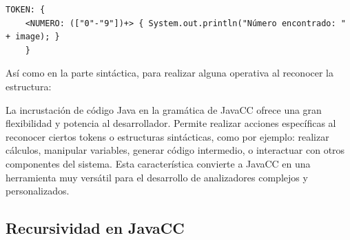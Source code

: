\begin{lstlisting}
TOKEN: {
	<NUMERO: (["0"-"9"])+> { System.out.println("Número encontrado: " + image); }
	}
\end{lstlisting}

Así como en la parte sintáctica, para realizar alguna operativa al reconocer la estructura:

\lstset{inputencoding=utf8/latin1}



La incrustación de código Java en la gramática de JavaCC ofrece una gran flexibilidad y potencia al desarrollador. Permite realizar acciones específicas al reconocer ciertos tokens o estructuras sintácticas, como por ejemplo: realizar cálculos, manipular variables, generar código intermedio, o interactuar con otros componentes del sistema. Esta característica convierte a JavaCC en una herramienta muy versátil para el desarrollo de analizadores complejos y personalizados.

\subsection{Recursividad en JavaCC}







